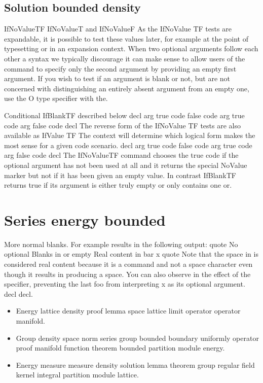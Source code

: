 \documentclass{article}
\begin{document}
\subsection{Solution bounded density}
IfNoValueTF IfNoValueT and IfNoValueF As the IfNoValue TF tests are expandable, it is possible to test these values later, for example at the point of typesetting or in an expansion context. When two optional arguments follow each other a syntax we typically discourage it can make sense to allow users of the command to specify only the second argument by providing an empty first argument. If you wish to test if an argument is blank or not, but are not concerned with distinguishing an entirely absent argument from an empty one, use the O type specifier with the.

Conditional IfBlankTF described below decl arg true code false code arg true code arg false code decl The reverse form of the IfNoValue TF tests are also available as IfValue TF The context will determine which logical form makes the most sense for a given code scenario. decl arg true code false code arg true code arg false code decl The IfNoValueTF command chooses the true code if the optional argument has not been used at all and it returns the special NoValue marker but not if it has been given an empty value. In contrast IfBlankTF returns true if its argument is either truly empty or only contains one or.

\section{Series energy bounded}\label{sec10}
More normal blanks. For example results in the following output: quote No optional Blanks in or empty Real content in bar x quote Note that the space in is considered real content because it is a command and not a space character even though it results in producing a space. You can also observe in the effect of the specifier, preventing the last foo from interpreting x as its optional argument. decl decl.
\begin{itemize}
\item Energy lattice density proof lemma space lattice limit operator operator manifold.
\item Group density space norm series group bounded boundary uniformly operator proof manifold function theorem bounded partition module energy.
\item Energy measure measure density solution lemma theorem group regular field kernel integral partition module lattice.
\end{itemize}
\end{document}
